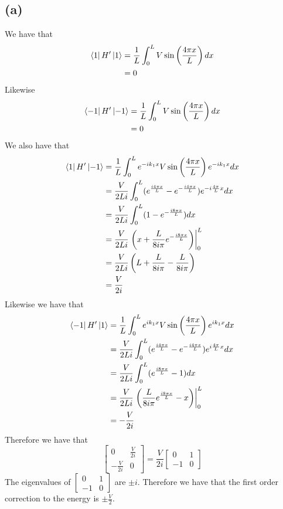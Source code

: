 \documentclass[11pt]{article}
\begin{document}
\subsection*{(a)}
We have that 
\begin{align*}
    \bra{1}H'\ket{1}&=\frac{1}{L}\int_{0}^{L}V\sin\left(\frac{4\pi x}{L}\right)dx\\
    &=0
\end{align*}
Likewise 
\begin{align*}
    \bra{-1}H'\ket{-1}&=\frac{1}{L}\int_{0}^{L}V\sin\left(\frac{4\pi x}{L}\right)dx\\
    &=0
\end{align*}
We also have that 
\begin{align*}
    \bra{1}H'\ket{-1}&=\frac{1}{L}\int_{0}^{L}e^{-ik_1x}V\sin\left(\frac{4\pi x}{L}\right)e^{-ik_1x}dx\\
    &=\frac{V}{2Li}\int_{0}^{L}(e^{\frac{i4\pi x}{L}}-e^{-\frac{i4\pi x}{L}})e^{-i\frac{4\pi}{L}x}dx\\
    &=\frac{V}{2Li}\int_{0}^{L}(1-e^{-\frac{i8\pi x}{L}})dx\\
    &=\frac{V}{2Li}\left.\left(x+\frac{L}{8i\pi}e^{-\frac{i8\pi x}{L}}\right)\right|_{0}^{L}\\
    &=\frac{V}{2Li}\left(L+\frac{L}{8i\pi}-\frac{L}{8i\pi}\right)\\
    &=\frac{V}{2i}\\
\end{align*}
Likewise we have that
\begin{align*}
    \bra{-1}H'\ket{1}&=\frac{1}{L}\int_{0}^{L}e^{ik_1x}V\sin\left(\frac{4\pi x}{L}\right)e^{ik_1x}dx\\
    &=\frac{V}{2Li}\int_{0}^{L}(e^{\frac{i4\pi x}{L}}-e^{-\frac{i4\pi x}{L}})e^{i\frac{4\pi}{L}x}dx\\
    &=\frac{V}{2Li}\int_{0}^{L}(e^{\frac{i8\pi x}{L}}-1)dx\\
    &=\frac{V}{2Li}\left.\left(\frac{L}{8i\pi}e^{\frac{i8\pi x}{L}}-x\right)\right|_{0}^{L}\\
    &=-\frac{V}{2i}\\
\end{align*}
Therefore we have that
$$\begin{bmatrix}
    0 & \frac{V}{2i}\\
    -\frac{V}{2i} & 0
\end{bmatrix}=\frac{V}{2i}\begin{bmatrix}
    0 & 1\\
    -1 & 0
\end{bmatrix}$$
The eigenvalues of $\begin{bmatrix}
    0 & 1\\
    -1 & 0
\end{bmatrix}$ are $\pm i$. Therefore we have that the first order 
correction to the energy is $\pm \frac{V}{2}$.
\end{document}
